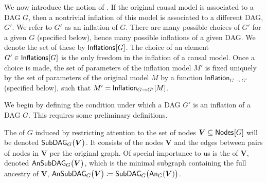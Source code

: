 We now introduce the notion of .  %
If the original causal model is associated to a DAG $G$, then a nontrivial inflation of this model is associated to a different DAG, $G'$.  
We refer to $G'$ as an inflation of $G$.  There are many possible choices of $G'$ for a given $G$ (specified below), hence many possible inflations of a given DAG.  We denote the set of these by $\SmallNamedFunction{Inflations}{G}$.   The choice of an element $G'\in \SmallNamedFunction{Inflations}{G}$ is the only freedom in the inflation of a causal model.  Once a choice is made, the set of parameters of the inflation model $M'$ is fixed uniquely by the set of parameters of the original model $M$ by a function $\mathsf{Inflation}_{G\to G'}$ (specified below), such that $M' = \SmallNamedFunction[G\to G']{Inflation}{M}$.

We begin by defining the condition under which a DAG $G'$  is an inflation of a DAG $G$.  This requires some preliminary definitions. 

The  of $G$ induced by restricting attention to the set of nodes $\bm{V}\subseteq \SmallNamedFunction{Nodes}{G}$ will be denoted $\subgraph[G]{\bm{V}}$.
It consists of the nodes $\bm{V}$ and the edges between pairs of nodes in $\bm{V}$ per the original graph. Of special importance to us is the 
 of $\bm{V}$, denoted $\ansubgraph[G]{\bm{V}}$, which is the minimal subgraph containing the full ancestry of $\bm{V}$, $\ansubgraph[G]{\bm{V}}\coloneqq\subgraph[G]{\An[G]{\bm{V}}}$. 


